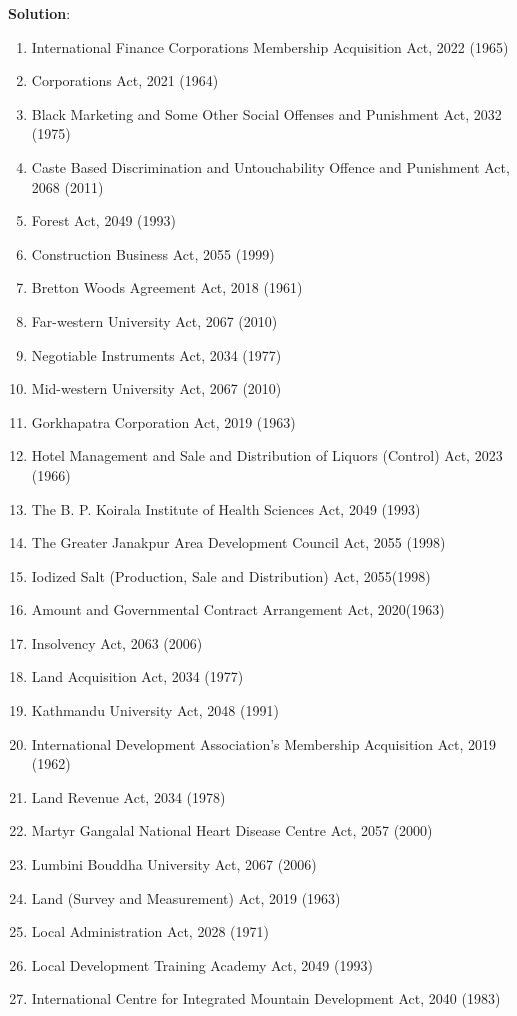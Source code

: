 \documentclass[
  openany]{book}
\newenvironment{solution}{ {\bfseries Solution}:}{}
\begin{document}
\begin{questions}
\begin{solution}
\begin{enumerate}
\item International Finance Corporations Membership Acquisition Act, 2022 (1965)
\item Corporations Act, 2021 (1964)
\item Black Marketing and Some Other Social Offenses and Punishment Act, 2032 (1975)
\item Caste Based Discrimination and Untouchability Offence and Punishment Act, 2068 (2011)
\item Forest Act, 2049 (1993)
\item Construction Business Act, 2055 (1999)
\item Bretton Woods Agreement Act, 2018 (1961)
\item Far-western University Act, 2067 (2010)
\item Negotiable Instruments Act, 2034 (1977)
\item Mid-western University Act, 2067 (2010)
\item Gorkhapatra Corporation Act, 2019 (1963)
\item Hotel Management and Sale and Distribution of Liquors (Control) Act, 2023 (1966)
\item The B. P. Koirala Institute of Health Sciences Act, 2049 (1993)
\item The Greater Janakpur Area Development Council Act, 2055 (1998)
\item Iodized Salt (Production, Sale and Distribution) Act, 2055(1998)
\item Amount and Governmental Contract Arrangement Act, 2020(1963)
\item Insolvency Act, 2063 (2006)
\item Land Acquisition Act, 2034 (1977)
\item Kathmandu University Act, 2048 (1991)
\item International Development Association’s Membership Acquisition Act, 2019 (1962)
\item Land Revenue Act, 2034 (1978)
\item Martyr Gangalal National Heart Disease Centre Act, 2057 (2000)
\item Lumbini Bouddha University Act, 2067 (2006)
\item Land (Survey and Measurement) Act, 2019 (1963)
\item Local Administration Act, 2028 (1971)
\item Local Development Training Academy Act, 2049 (1993)
\item International Centre for Integrated Mountain Development Act, 2040 (1983)

\end{enumerate}
\end{solution}
\end{questions}
\end{document}
